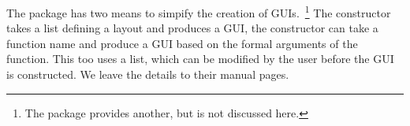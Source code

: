 The  package has two means to simpify the creation of
GUIs.~\footnote{The  package provides another, but is not
  discussed here.} The  constructor takes a list defining a
layout and produces a GUI, the  constructor can
take a function name and produce a GUI based on the formal arguments
of the function. This too uses a list, which can be modified by the
user before the GUI is constructed. We leave the details to their
manual pages.









